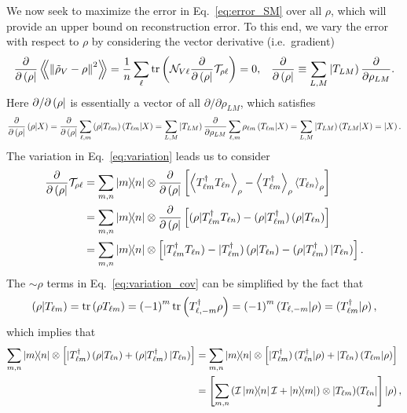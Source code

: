 \documentclass[notitlepage,twocolumn]{revtex4-2}
\newcommand{\f}[2]{\dfrac{#1}{#2}} %
\newcommand{\p}[1]{\left(#1\right)} %
\renewcommand{\sp}[1]{\left[#1\right]} %
\newcommand{\bk}{\Braket} %
\newcommand{\Bbk}[1]
{\left\langle\!\!\left\langle #1 \right\rangle\!\!\right\rangle}
\newcommand{\I}{\mathcal{I}}
\newcommand{\N}{\mathcal{N}}
\newcommand{\T}{\mathcal{T}}
\def\obra#1{\mathinner{({#1}|}}
\def\oket#1{\mathinner{|{#1})}}
\def\obk#1{\mathinner{({#1})}}
\def\oop#1#2{\oket{#1}\!\obra{#2}}
\begin{document}
We now seek to maximize the error in Eq.~\eqref{eq:error_SM} over all $\rho$, which will provide an upper bound on reconstruction error.
To this end, we vary the error with respect to $\rho$ by considering the vector derivative (i.e.~gradient)
\begin{align}
  \f{\partial}{\partial\obra\rho} \Bbk{\norm{\tilde\rho_V-\rho}^2}
  = \f1n \sum_\ell \tr\p{\N_{V\ell}
    \f{\partial}{\partial\obra\rho} \T_{\rho\ell}}
  = 0,
  &&
  \f{\partial}{\partial\obra\rho}
  \equiv \sum_{L,M} \oket{T_{LM}} \f{\partial}{\partial\rho_{LM}}.
  \label{eq:variation}
\end{align}
Here $\partial/\partial\obra\rho$ is essentially a vector of all $\partial/\partial\rho_{LM}$, which satisfies
\begin{align}
  \f{\partial}{\partial\obra\rho} \obk{\rho|X}
  = \f{\partial}{\partial\obra\rho}
  \sum_{\ell,m} \obk{\rho|T_{\ell m}} \obk{T_{\ell m}|X}
  = \sum_{L,M} \oket{T_{LM}} \f{\partial}{\partial\rho_{LM}}
  \sum_{\ell,m} \rho_{\ell m} \obk{T_{\ell m}|X}
  = \sum_{L,M} \oket{T_{LM}} \obk{T_{LM}|X}
  = \oket{X}.
\end{align}
The variation in Eq.~\eqref{eq:variation} leads us to consider
\begin{align}
  \f{\partial}{\partial\obra\rho} \T_{\rho\ell}
  &= \sum_{m,n} \op{m}{n} \otimes \f{\partial}{\partial\obra\rho}
  \sp{\bk{T_{\ell m}^\dag T_{\ell n}}_\rho
    - \bk{T_{\ell m}^\dag}_\rho \bk{T_{\ell n}}_\rho} \\
  &= \sum_{m,n} \op{m}{n} \otimes \f{\partial}{\partial\obra\rho}
  \sp{\obk{\rho|T_{\ell m}^\dag T_{\ell n}}
    - \obk{\rho|T_{\ell m}^\dag} \obk{\rho|T_{\ell n}}} \\
  &= \sum_{m,n} \op{m}{n} \otimes \sp{\oket{T_{\ell m}^\dag T_{\ell n}}
    - \oket{T_{\ell m}^\dag} \obk{\rho|T_{\ell n}}
    - \obk{\rho|T_{\ell m}^\dag} \oket{T_{\ell n}}}.
  \label{eq:variation_cov}
\end{align}
The $\sim\rho$ terms in Eq.~\eqref{eq:variation_cov} can be simplified by the fact that
\begin{align}
  \obk{\rho|T_{\ell m}}
  = \tr\p{\rho T_{\ell m}}
  = \p{-1}^m \tr\p{T_{\ell,-m}^\dag \rho}
  = \p{-1}^m \obk{T_{\ell,-m}|\rho}
  = \obk{T_{\ell m}^\dag|\rho},
\end{align}
which implies that
\begin{align}
  \sum_{m,n} \op{m}{n} \otimes
  \sp{\oket{T_{\ell m}^\dag} \obk{\rho|T_{\ell n}}
    + \obk{\rho|T_{\ell m}^\dag} \oket{T_{\ell n}}}
  &= \sum_{m,n} \op{m}{n} \otimes
  \sp{\oket{T_{\ell m}^\dag} \obk{T_{\ell n}^\dag|\rho}
    + \oket{T_{\ell n}} \obk{T_{\ell m}|\rho}} \\
  &= \sp{\sum_{m,n} \p{\I\op{m}{n}\I + \op{n}{m}}
    \otimes \oop{T_{\ell m}}{T_{\ell n}}} \oket{\rho},
\end{align}
\end{document}
